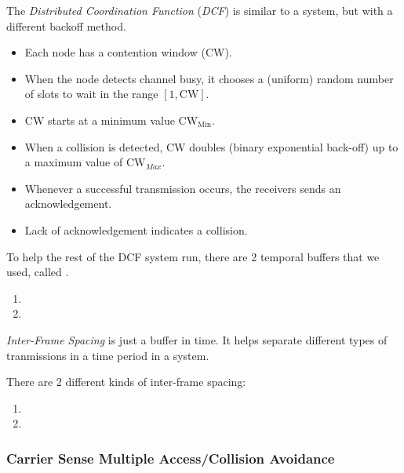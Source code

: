 \begin{definition}\label{def:WiFi_DCF}
  The \emph{Distributed Coordination Function} (\emph{DCF}) is similar to a   system, but with a different backoff method.
  \begin{itemize}[noitemsep]
  \item Each node has a contention window (CW).
  \item When the node detects channel busy, it chooses a (uniform) random number of slots to wait in the range $[1, \mathrm{CW}]$.
  \item $\mathrm{CW}$ starts at a minimum value $\mathrm{CW}_{\mathrm{Min}}$.
  \item When a collision is detected, $\mathrm{CW}$ doubles (binary exponential back-off) up to a maximum value of $\mathrm{CW}_{Max}$.
  \item Whenever a successful transmission occurs, the receivers sends an acknowledgement.
  \item Lack of acknowledgement indicates a collision.
  \end{itemize}

  To help the rest of the DCF system run, there are 2 temporal buffers that we used, called .
  \begin{enumerate}[noitemsep]
  \item {}
  \item {}
  \end{enumerate}
\end{definition}

\begin{definition}\label{def:Inter_Frame_Spacing}
  \emph{Inter-Frame Spacing} is just a buffer in time.
  It helps separate different types of tranmissions in a time period in a  system.

  There are 2 different kinds of inter-frame spacing:
  \begin{enumerate}[noitemsep]
  \item {}
  \item {}
  \end{enumerate}
\end{definition}


\subsubsection{Carrier Sense Multiple Access/Collision Avoidance}\label{subsubsec:CSMACA}


